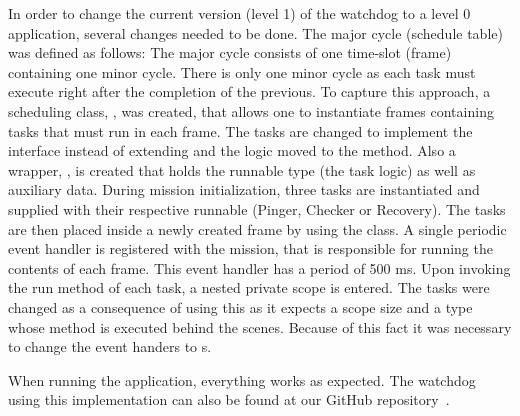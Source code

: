 In order to change the current version (level 1) of the watchdog to a level 0 application, several changes needed to be done. The major cycle (schedule table) was defined as follows: The major cycle consists of one time-slot (frame) containing one minor cycle. There is only one minor cycle as each task must execute right after the completion of the previous. To capture this approach, a scheduling class, , was created, that allows one to instantiate frames containing tasks that must run in each frame. The tasks are changed to implement the  interface instead of extending  and the logic moved to the  method. Also a wrapper, , is created that holds the runnable type (the task logic) as well as auxiliary data. During mission initialization, three tasks are instantiated and supplied with their respective runnable (Pinger, Checker or Recovery). The tasks are then placed inside a newly created frame by using the  class. A single periodic event handler is registered with the mission, that is responsible for running the contents of each frame. This event handler has a period of 500 ms. Upon invoking the run method of each task, a nested private scope is entered. The tasks were changed as a consequence of using this  as it expects a scope size and a  type whose  method is executed behind the scenes. Because of this fact it was necessary to change the event handers to s.

When running the application, everything works as expected. The watchdog using this implementation can also be found at our GitHub repository~\cite{SW902e12:CSPinSCJ}.


